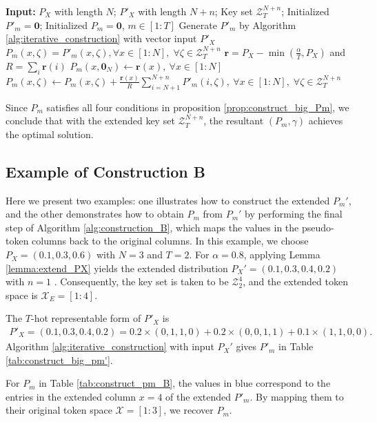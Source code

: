 \documentclass[11pt,letterpaper]{article}
\newcommand{\cX}{\mathcal{X}}
\newcommand{\cZ}{\mathcal{Z}}
\begin{document}
\begin{algorithm}[h]
\caption{$P_m$: Construction B}
\label{alg:construction_B}
\begin{algorithmic}[1]
\State \textbf{Input:} $P_X$ with length $N$; $P'_X$ with length $N+n$; Key set $\cZ^{N+n}_T$; Initialized $P'_m = \mathbf{0}$; Initialized $P_m = \mathbf{0}$, $m \in [1:T]$ 
\State Generate $P'_m$ by Algorithm \ref{alg:iterative_construction} with vector input $P'_X$
\State $P_m(x,\zeta) = P'_m(x,\zeta), \forall x \in [1:N], \; \forall \zeta \in \cZ^{N+n}_T$ 
\State  $\boldsymbol{r} = P_X - \min(\tfrac{\alpha}{T}, P_X)$ and $R = \sum_i\boldsymbol{r}(i)$
\State $P_m(x, \mathbf{0}_N) \gets \boldsymbol{r}(x), ~\forall x \in [1:N]$  
\Else
    \State $P_m(x, \zeta) \gets  P_m(x, \zeta) + \frac{\boldsymbol{r}(x)}{R} \sum_{i=N+1}^{N+n} P'_m (i, \zeta), ~\forall x \in [1:N], \; \forall \zeta \in \cZ^{N+n}_T$
\EndIf
\end{algorithmic}
\end{algorithm}

Since $P_m$ satisfies all four conditions in proposition \ref{prop:construct_big_Pm}, we conclude that with the extended key set $\cZ^{N+n}_T$, the resultant $(P_m, \gamma)$ achieves the optimal solution. 

\subsection{Example of Construction B} 
Here we present two examples: one illustrates how to construct the extended $P_m'$, and the other demonstrates how to obtain $P_m$ from $P_m'$ by performing the final step of Algorithm \ref{alg:construction_B}, which maps the values in the pseudo-token columns back to the original columns. In this example, we choose $P_X = (0.1, 0.3, 0.6)$ with $N=3$ and $T=2$. For $\alpha = 0.8$, applying Lemma \ref{lemma:extend_PX} yields the extended distribution $P_X' = (0.1, 0.3, 0.4, 0.2)$ with $n=1$ . Consequently, the key set is taken to be $\cZ^4_2$, and the extended token space is $\cX_E = [1:4]$.

The $T$-hot representable form of $P'_X$ is 
\begin{align}
    P'_X = (0.1, 0.3, 0.4, 0.2) = 0.2 \times (0,1,1,0) + 0.2 \times (0,0,1,1) + 0.1 \times (1,1,0,0).
\end{align}
Algorithm \ref{alg:iterative_construction} with input $P_X'$ gives $P'_m$ in Table \ref{tab:construct_big_pm'}. 

For $P_m$ in Table \ref{tab:construct_pm_B}, the values in blue correspond to the entries in the extended column $x = 4$ of the extended $P'_m$. By mapping them to their original token space $\cX = [1:3]$, we recover $P_m$.
\end{document}
